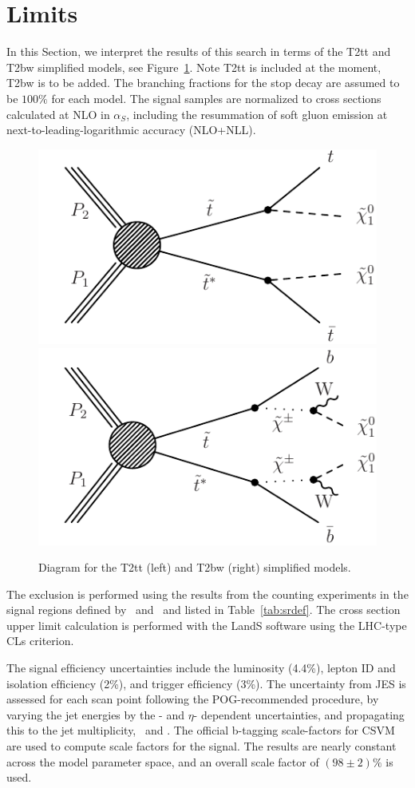 \section{Limits}
\label{sec:signal}

In this Section, we interpret the results of this search in terms of
the T2tt and T2bw simplified models, see Figure~\ref{fig:SigDiagram}.
Note T2tt is included at the moment, T2bw is to be added.
The branching fractions for the stop decay are assumed to be $100\%$
for each model. The signal samples are normalized to cross sections
calculated at NLO in $\alpha_S$, including the resummation of soft gluon emission at 
next-to-leading-logarithmic accuracy (NLO+NLL). 

\begin{figure}[hbt]
  \begin{center}
        \includegraphics[width=0.5\linewidth]{plots/stopPlot/T2tt.pdf}%
        \includegraphics[width=0.5\linewidth]{plots/stopPlot/T2bw.pdf}%
	\caption{Diagram for the T2tt (left) and T2bw (right)
          simplified models.}
	\label{fig:SigDiagram}
      \end{center}
\end{figure}

The exclusion is performed using the results from the counting experiments in the signal regions
defined by \met\ and \mt\ and listed in Table~\ref{tab:srdef}. 
The cross section upper limit calculation is performed with the LandS software using the LHC-type CLs criterion. 

The signal efﬁciency uncertainties include the luminosity (4.4\%), lepton ID and isolation
efﬁciency (2\%), and trigger efﬁciency (3\%). The uncertainty from JES
is assessed for each scan point following the POG-recommended
procedure, by varying the jet energies by the \pt- and $\eta$-
dependent uncertainties, and propagating this to the jet multiplicity,
\met\ and \mt. The official b-tagging scale-factors for CSVM are used to compute scale
factors for the signal. The results are nearly constant across the
model parameter space, and an overall scale factor of $(98 \pm 2)\%$
is used. 

